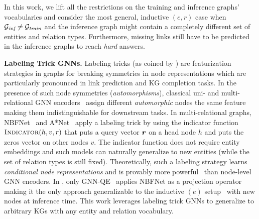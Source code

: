 In this work, we lift all the restrictions on the training and inference graphs' vocabularies and consider the most general, inductive $(e,r)$ case when $\mathcal{G}_{\textit{inf}} \neq \mathcal{G}_{\textit{train}}$ and the inference graph might contain a completely different set of entities and relation types.
Furthermore, missing links still have to be predicted in the inference graphs to reach \emph{hard} answers.

\textbf{Labeling Trick GNNs.}
Labeling tricks (as coined by \citet{labeling_trick}) are featurization strategies in graphs for breaking %
symmetries in node representations which are particularly pronounced in link prediction and KG completion tasks. 
In the presence of such node symmetries (\emph{automorphisms}), classical uni- and multi-relational GNN encoders~\citep{gcn, gat, compgcn} assign different \emph{automorphic} nodes the same feature making them indistinguishable for downstream tasks.
In multi-relational graphs, NBFNet~\citep{nbfnet} and A*Net~\citep{astarnet} apply a labeling trick by using the indicator function $\textsc{Indicator}(h,v,r)$ that puts a query vector ${\bm{r}}$ on a head node $h$ and puts the zeros vector on other nodes $v$. 
The indicator function does not require entity embeddings and such models can naturally generalize to new %
entities (while the set of relation types is still fixed).
Theoretically, such a labeling strategy learns \emph{conditional node representations} and is provably more powerful~\citep{rwl2} than node-level GNN encoders. 
In \clqa, only GNN-QE~\citep{gnn_qe} applies NBFNet as a projection operator making it the only approach generalizable to the inductive $(e)$ setup~\citep{galkin2022} with new nodes at inference time. 
This work leverages labeling trick GNNs to generalize \clqa to arbitrary KGs with any entity and relation vocabulary.